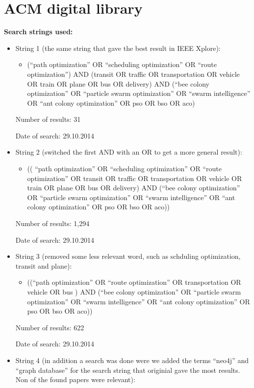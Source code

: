 \section{ACM digital library}
\textbf{Search strings used:}
\begin{itemize}
\item String 1 (the same string that gave the best result in IEEE Xplore): 
\begin{itemize}
\item (``path optimization'' OR ``scheduling optimization'' OR ``route optimization'') AND (transit OR traffic OR transportation OR vehicle OR train OR plane OR bus OR delivery) AND (``bee colony optimization'' OR ``particle swarm optimization'' OR ``swarm intelligence'' OR ``ant colony optimization'' OR pso OR bso OR aco)
\end{itemize} 
\par Number of results: 31
\par Date of search: 29.10.2014


\item String 2 (switched the first AND with an OR to get a more general result): 
\begin{itemize}
\item (( ``path optimization'' OR ``scheduling optimization'' OR ``route optimization'' OR transit OR traffic OR transportation OR vehicle OR train OR plane OR bus OR delivery) AND (``bee colony optimization'' OR ``particle swarm optimization'' OR ``swarm intelligence'' OR ``ant colony optimization'' OR pso OR bso OR aco))
\end{itemize}
\par Number of results: 1,294
\par Date of search: 29.10.2014


\item String 3 (removed some less relevant word, such as schduling optimization, transit and plane): 
\begin{itemize}
\item ((``path optimization'' OR ``route optimization'' OR transportation OR vehicle OR bus ) AND (``bee colony optimization'' OR ``particle swarm optimization'' OR ``swarm intelligence'' OR ``ant colony optimization'' OR pso OR bso OR aco))
\end{itemize}
\par Number of results: 622
\par Date of search: 29.10.2014


\item String 4 (in addition a search was done were we added the terms ``neo4j'' and ``graph database'' for the search string that originial gave the most results. Non of the found papers were relevant): 



\end{itemize}

